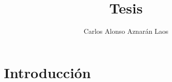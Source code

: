 \documentclass[12pt,a4paper,openany]{book}
\author{Carlos Alonso Aznarán Laos}
\title{Tesis}
\begin{document}
\maketitle
\tableofcontents
\chapter{Introducción}


\end{document}
